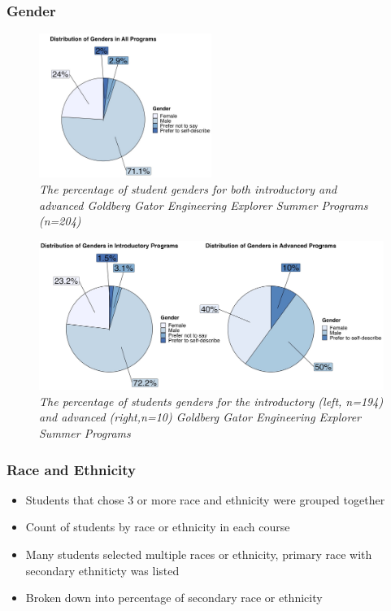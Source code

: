 \documentclass[
]{article}
\providecommand{\tightlist}{%
  \setlength{\itemsep}{0pt}\setlength{\parskip}{0pt}}
\begin{document}
\hypertarget{gender}{%
\subsubsection{Gender}\label{gender}}

\begin{figure}
\centering
\includegraphics[width=0.5\textwidth,height=\textheight]{Graphs/Report/GGEE_23_Gender_All.jpg}
\caption{\emph{The percentage of student genders for both introductory
and advanced Goldberg Gator Engineering Explorer Summer Programs
(n=204)}}
\end{figure}

\begin{figure}
\centering
\includegraphics{Graphs/Report/GGEE_23_Gender_IA.jpg}
\caption{\emph{The percentage of students genders for the introductory
(left, n=194) and advanced (right,n=10) Goldberg Gator Engineering
Explorer Summer Programs}}
\end{figure}

\hypertarget{race-and-ethnicity}{%
\subsubsection{Race and Ethnicity}\label{race-and-ethnicity}}

\begin{itemize}
\tightlist
\item
  Students that chose 3 or more race and ethnicity were grouped together
\item
  Count of students by race or ethnicity in each course
\item
  Many students selected multiple races or ethnicity, primary race with
  secondary ethniticty was listed
\item
  Broken down into percentage of secondary race or ethnicity
\end{itemize}
\end{document}

